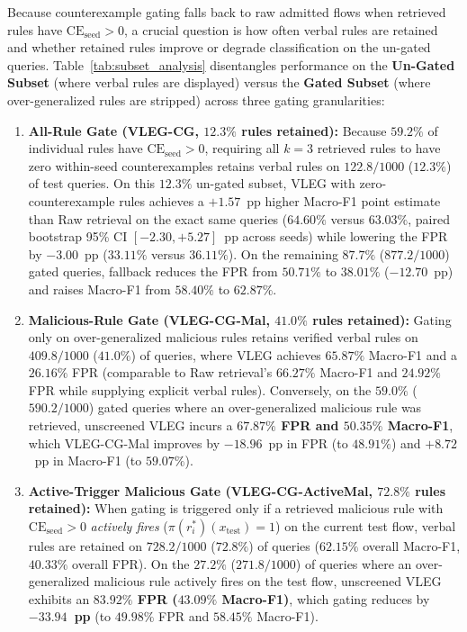 \documentclass[10pt,a4paper,onecolumn]{article}
\theoremstyle{definition}
\theoremstyle{remark}
\begin{document}
Because counterexample gating falls back to raw admitted flows when retrieved rules have $\mathrm{CE}_{\mathrm{seed}} > 0$, a crucial question is how often verbal rules are retained and whether retained rules improve or degrade classification on the un-gated queries. Table~\ref{tab:subset_analysis} disentangles performance on the \textbf{Un-Gated Subset} (where verbal rules are displayed) versus the \textbf{Gated Subset} (where over-generalized rules are stripped) across three gating granularities:
\begin{enumerate}[leftmargin=1.8em]
    \item \textbf{All-Rule Gate (VLEG-CG, $12.3\%$ rules retained):} Because $59.2\%$ of individual rules have $\mathrm{CE}_{\mathrm{seed}} > 0$, requiring all $k=3$ retrieved rules to have zero within-seed counterexamples retains verbal rules on $122.8/1000$ ($12.3\%$) of test queries. On this $12.3\%$ un-gated subset, VLEG with zero-counterexample rules achieves a $+1.57$~pp higher Macro-F1 point estimate than Raw retrieval on the exact same queries ($64.60\%$ versus $63.03\%$, paired bootstrap 95\% CI $[-2.30, +5.27]$~pp across seeds) while lowering the FPR by $-3.00$~pp ($33.11\%$ versus $36.11\%$). On the remaining $87.7\%$ ($877.2/1000$) gated queries, fallback reduces the FPR from $50.71\%$ to $38.01\%$ ($-12.70$~pp) and raises Macro-F1 from $58.40\%$ to $62.87\%$.
    \item \textbf{Malicious-Rule Gate (VLEG-CG-Mal, $41.0\%$ rules retained):} Gating only on over-generalized malicious rules retains verified verbal rules on $409.8/1000$ ($41.0\%$) of queries, where VLEG achieves $65.87\%$ Macro-F1 and a $26.16\%$ FPR (comparable to Raw retrieval's $66.27\%$ Macro-F1 and $24.92\%$ FPR while supplying explicit verbal rules). Conversely, on the $59.0\%$ ($590.2/1000$) gated queries where an over-generalized malicious rule was retrieved, unscreened VLEG incurs a \textbf{$67.87\%$ FPR and $50.35\%$ Macro-F1}, which VLEG-CG-Mal improves by $-18.96$~pp in FPR (to $48.91\%$) and $+8.72$~pp in Macro-F1 (to $59.07\%$).
    \item \textbf{Active-Trigger Malicious Gate (VLEG-CG-ActiveMal, $72.8\%$ rules retained):} When gating is triggered only if a retrieved malicious rule with $\mathrm{CE}_{\mathrm{seed}} > 0$ \emph{actively fires} ($\pi(r_i^*)(x_{\mathrm{test}}) = 1$) on the current test flow, verbal rules are retained on $728.2/1000$ ($72.8\%$) of queries ($62.15\%$ overall Macro-F1, $40.33\%$ overall FPR). On the $27.2\%$ ($271.8/1000$) of queries where an over-generalized malicious rule actively fires on the test flow, unscreened VLEG exhibits an \textbf{$83.92\%$ FPR ($43.09\%$ Macro-F1)}, which gating reduces by \textbf{$-33.94$~pp} (to $49.98\%$ FPR and $58.45\%$ Macro-F1).
\end{enumerate}
\end{document}
